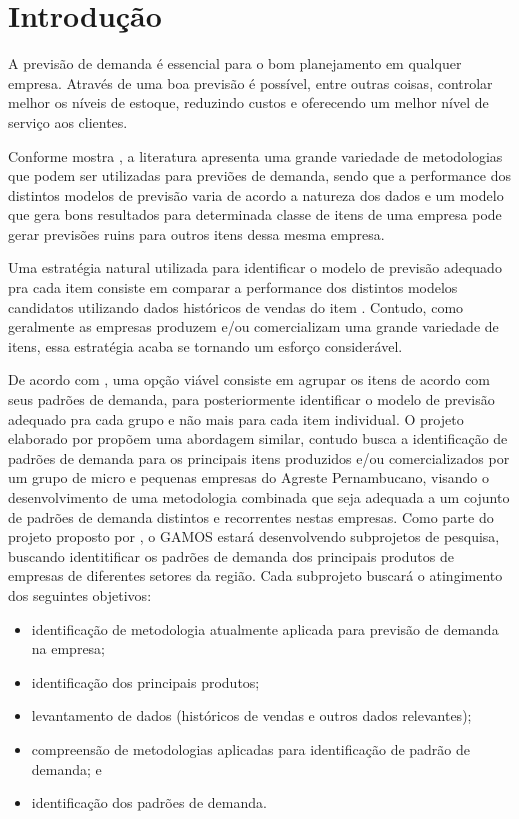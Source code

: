 \documentclass[11pt,letterpaper,twocolumn]{article}
\begin{document}
\section{Introdução}

A previsão de demanda é essencial para o bom planejamento em qualquer empresa. Através de uma boa previsão é possível, entre outras coisas, controlar melhor os níveis de estoque, reduzindo custos e oferecendo um melhor nível de serviço aos clientes. 

Conforme mostra \cite{MakridakisHibon2000}, a literatura apresenta uma grande variedade de metodologias que podem ser utilizadas para previões de demanda, sendo que a performance dos distintos modelos de previsão varia de acordo a natureza dos dados e um modelo que gera bons resultados para determinada classe de itens de uma empresa pode gerar previsões ruins para outros itens dessa mesma empresa.

Uma estratégia natural utilizada para identificar o modelo de previsão adequado pra cada item consiste em comparar a performance dos distintos modelos candidatos utilizando dados históricos de vendas do item \citep{UlrichEtAl2022}. Contudo, como geralmente as empresas produzem e/ou comercializam uma grande variedade de itens, essa estratégia acaba se tornando um esforço considerável. 

De acordo com \cite{UlrichEtAl2022}, uma opção viável consiste em agrupar os itens de acordo com seus padrões de demanda, para posteriormente identificar o modelo de previsão adequado pra cada grupo e não mais para cada item individual. O projeto elaborado por \cite{Fraga2019} propõem uma abordagem similar, contudo busca a identificação de padrões de demanda para os principais itens produzidos e/ou comercializados por um grupo de micro e pequenas empresas do Agreste Pernambucano, visando o desenvolvimento de uma metodologia combinada que seja adequada a um cojunto de padrões de demanda distintos e recorrentes nestas empresas. Como parte do projeto proposto por \cite{Fraga2019}, o GAMOS estará desenvolvendo subprojetos de pesquisa, buscando identitificar os padrões de demanda dos principais produtos de empresas de diferentes setores da região. Cada subprojeto buscará o atingimento dos seguintes objetivos:

\begin{itemize}
  \item identificação de metodologia atualmente aplicada para previsão de demanda na empresa;
  \item identificação dos principais produtos; 
  \item levantamento de dados (históricos de vendas e outros dados relevantes);
  \item compreensão de metodologias aplicadas para identificação de padrão de demanda; e
  \item identificação dos padrões de demanda.
\end{itemize}
  
\end{document}
